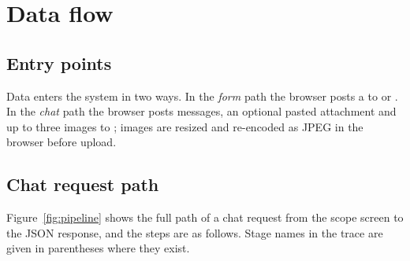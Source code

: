 \chapter{Data flow}\label{ch:flow}

\section{Entry points}
Data enters the system in two ways. In the \emph{form} path the browser posts a  to  or . In the \emph{chat} path the browser posts messages, an optional pasted attachment and up to three images to ; images are resized and re-encoded as JPEG in the browser before upload.

\section{Chat request path}
Figure~\ref{fig:pipeline} shows the full path of a chat request from the scope screen to the JSON response, and the steps are as follows. Stage names in the trace are given in parentheses where they exist.
